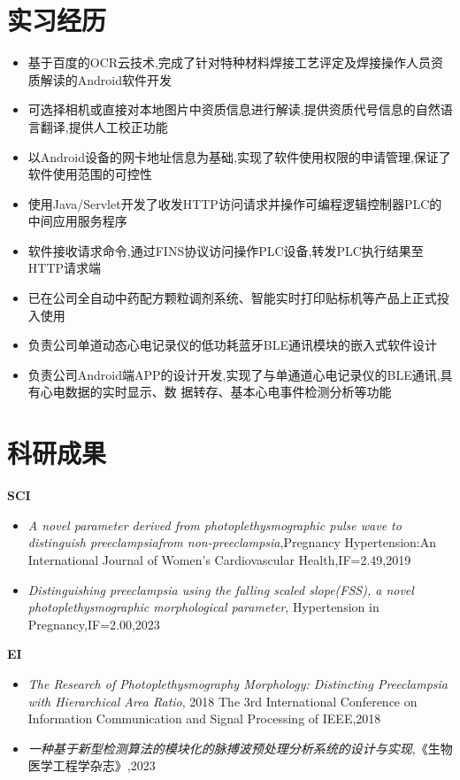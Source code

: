 \documentclass{resume}
\begin{document}
\section{实习经历}
\begin{itemize}
    \item 基于百度的OCR云技术,完成了针对特种材料焊接工艺评定及焊接操作人员资质解读的Android软件开发
    \item 可选择相机或直接对本地图片中资质信息进行解读,提供资质代号信息的自然语言翻译,提供人工校正功能
    \item 以Android设备的网卡地址信息为基础,实现了软件使用权限的申请管理,保证了软件使用范围的可控性
\end{itemize}
\begin{itemize}
    \item 使用Java/Servlet开发了收发HTTP访问请求并操作可编程逻辑控制器PLC的中间应用服务程序
    \item 软件接收请求命令,通过FINS协议访问操作PLC设备,转发PLC执行结果至HTTP请求端
    \item 已在公司全自动中药配方颗粒调剂系统、智能实时打印贴标机等产品上正式投入使用
\end{itemize}
\begin{itemize}
    \item 负责公司单道动态心电记录仪的低功耗蓝牙BLE通讯模块的嵌入式软件设计
    \item 负责公司Android端APP的设计开发,实现了与单通道心电记录仪的BLE通讯,具有心电数据的实时显示、数
    据转存、基本心电事件检测分析等功能
\end{itemize}

\section{科研成果}
\textbf{SCI}
\begin{itemize}
  \item \textit{A novel parameter derived from photoplethysmographic pulse wave to distinguish preeclampsiafrom
  non-preeclampsia},Pregnancy Hypertension:An International Journal of Women's Cardiovascular Health,IF=2.49,2019 
  \item \textit{Distinguishing preeclampsia using the falling scaled slope(FSS), a novel photoplethysmographic morphological parameter},
  Hypertension in Pregnancy,IF=2.00,2023 
\end{itemize}
\textbf{EI}
\begin{itemize}
  \item \textit{The Research of Photoplethysmography Morphology: Distincting Preeclampsia with Hierarchical Area Ratio},
  2018 The 3rd International Conference on Information Communication and Signal Processing of IEEE,2018 
  \item \textit{一种基于新型检测算法的模块化的脉搏波预处理分析系统的设计与实现},《生物医学工程学杂志》,2023 
\end{itemize}
\end{document}
